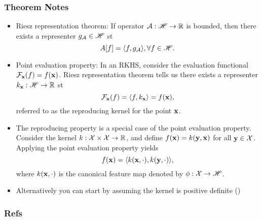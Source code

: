 \documentclass{beamer}
\begin{document}
\begin{frame}
\frametitle{Theorem Notes}
\begin{itemize}
\item Riesz representation theorem: If operator $\mathcal{A}: \mathscr{H} \to \mathbb{R}$
is bounded, then there exists a representer $g_{\mathcal{A}} \in \mathscr{H}$ st
$$A[f] = \langle f, g_{\mathcal{A}} \rangle, \forall f \in \mathscr{H}.$$
\item Point evaluation property: In an RKHS, consider the evaluation functional
$\mathcal{F}_{\mathbf{x}}(f) = f(\mathbf{x})$. Riesz representation theorem tells us there exists a
representer $k_{\mathbf{x}}: \mathscr{H}\to\mathbb{R}$ st
$$\mathcal{F}_{\mathbf{x}}(f) = \langle f, k_{\mathbf{x}}\rangle = f(\mathbf{x}),$$
referred to as the reproducing kernel for the point $\mathbf{x}$.
\item The reproducing property is a special case of the point evaluation
property. Consider the kernel $k: \mathcal{X} \times \mathcal{X} \to \mathbb{R}$,
and define $f(\mathbf{x}) = k(\mathbf{y}, \mathbf{x})$ for all $\mathbf{y} \in \mathcal{X}$.
Applying the point evaluation property yields
$$f(\mathbf{x}) = \langle k(\mathbf{x}, \cdot),  k(\mathbf{y}, \cdot)\rangle,$$
where $k(\mathbf{x}, \cdot)$ is the canonical feature map denoted by $\phi: \mathcal{X}\to\mathscr{H}$.
\item Alternatively you can start by assuming the kernel is positive definite ()
\end{itemize}
\end{frame}

\begin{frame}
\frametitle{Refs}

\end{frame}
\end{document}
